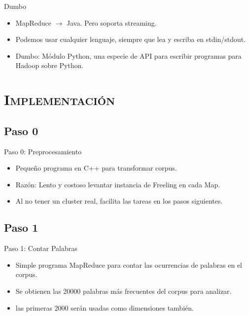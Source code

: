 \documentclass[xcolor=x11names,compress]{beamer}
\renewcommand{\(}{\begin{columns}}
\renewcommand{\)}{\end{columns}}
\newcommand{\<}[1]{\begin{column}{#1}}
\renewcommand{\>}{\end{column}}
\begin{document}
\begin{frame}{Dumbo}
\begin{itemize}
\item MapReduce $\rightarrow$ Java. Pero soporta streaming.
\item Podemos usar cualquier lenguaje, siempre que lea y escriba en stdin/stdout.
\item Dumbo: Módulo Python, una especie de API para escribir programas para Hadoop sobre Python.
\end{itemize}
\end{frame}


\section{\scshape Implementación}
\subsection{Paso 0}
\begin{frame}{Paso 0: Preprocesamiento}
\begin{itemize}
\item Pequeño programa en C++ para transformar corpus.
\item Razón: Lento y costoso levantar instancia de Freeling en cada Map.
\item Al no tener un cluster real, facilita las tareas en los pasos siguientes.
\end{itemize}
\end{frame}

\subsection{Paso 1}
\begin{frame}{Paso 1: Contar Palabras}
\begin{itemize}
\item Simple programa MapReduce para contar las ocurrencias de palabras en el corpus.
\item Se obtienen las 20000 palabras más frecuentes del corpus para analizar.
\item las primeras 2000 serán usadas como dimensiones también.
\end{itemize}
\end{frame}
\end{document}
